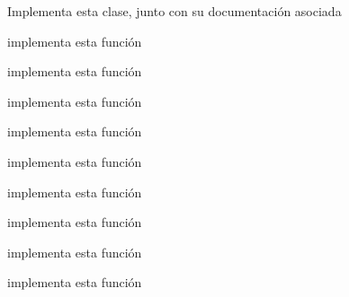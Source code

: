 
\begin{DoxyRefList}
\item[\label{todo__todo000012}%
\hypertarget{todo__todo000012}{}%
\-Clase \hyperlink{classdefM}{def\-M} ]\-Implementa esta clase, junto con su documentación asociada 
\item[\label{todo__todo000010}%
\hypertarget{todo__todo000010}{}%
\-Miembro \hyperlink{classdiccionario_a0af2e538b04d23e6b42e63060c1cf002}{diccionario\-:\-:cheq\-\_\-rep} () const ]implementa esta función  
\item[\label{todo__todo000002}%
\hypertarget{todo__todo000002}{}%
\-Miembro \hyperlink{classdiccionario_a60c722b06ff7e050bae71601f74d7549}{diccionario\-:\-:diccionario} ()]implementa esta función  
\item[\label{todo__todo000003}%
\hypertarget{todo__todo000003}{}%
\-Miembro \hyperlink{classdiccionario_a19558e1ad869a8791741b1359c87d80b}{diccionario\-:\-:diccionario} (const diccionario \&d)]implementa esta función  
\item[\label{todo__todo000009}%
\hypertarget{todo__todo000009}{}%
\-Miembro \hyperlink{classdiccionario_a8df27c218ef713041e09c9f799a1e9e6}{diccionario\-:\-:empty} () const ]implementa esta función  
\item[\label{todo__todo000004}%
\hypertarget{todo__todo000004}{}%
\-Miembro \hyperlink{classdiccionario_a5ce69ac88959ca76c60fe0875690320f}{diccionario\-:\-:find} (const nombre\-M \&s) const ]implementa esta función  
\item[\label{todo__todo000007}%
\hypertarget{todo__todo000007}{}%
\-Miembro \hyperlink{classdiccionario_abda03cfdf5848a07b2d93ebdc1238d27}{diccionario\-:\-:insert} (const entrada \&e)]implementa esta función  
\item[\label{todo__todo000008}%
\hypertarget{todo__todo000008}{}%
\-Miembro \hyperlink{classdiccionario_af34ed220d3e0faa56cbe713b97766f02}{diccionario\-:\-:operator=} (const diccionario \&org)]implementa esta función  
\item[\label{todo__todo000006}%
\hypertarget{todo__todo000006}{}%
\-Miembro \hyperlink{classdiccionario_a1dbf7b521d4ac17e0bcd5d3e5ecff93d}{diccionario\-:\-:operator\mbox{[}\mbox{]}} (const nombre\-M \&s) const ]implementa esta función  
\item[\label{todo__todo000005}%
\hypertarget{todo__todo000005}{}%
\-Miembro \hyperlink{classdiccionario_a8b2ac04f691e925d86967bbd62670a4d}{diccionario\-:\-:operator\mbox{[}\mbox{]}} (const nombre\-M \&s)]implementa esta función 
\end{DoxyRefList}